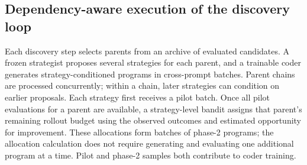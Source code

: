 \documentclass[10pt,letterpaper]{article}
\begin{document}
\subsection*{Dependency-aware execution of the discovery loop}

Each discovery step selects parents from an archive of evaluated candidates.
A frozen strategist proposes several strategies for each parent, and a
trainable coder generates strategy-conditioned programs in cross-prompt
batches. Parent chains are processed concurrently; within a chain, later
strategies can condition on earlier proposals. Each strategy first receives
a pilot batch. Once all pilot evaluations for a parent are available, a
strategy-level bandit assigns that parent's remaining rollout budget using
the observed outcomes and estimated opportunity for improvement. These
allocations form batches of phase-2 programs; the allocation calculation
does not require generating and evaluating one additional program at a time.
Pilot and phase-2 samples both contribute to coder training.
\end{document}
